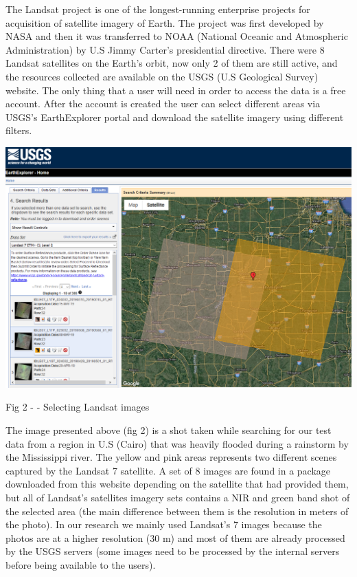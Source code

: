 \documentclass[12pt, a4paper]{report}
\begin{document}
\par 
The Landsat project is one of the longest-running enterprise projects for acquisition of satellite imagery of Earth. The project was first developed by NASA and then it was transferred to NOAA (National Oceanic and Atmospheric Administration) by U.S Jimmy Carter's presidential directive. There were 8 Landsat satellites on the Earth's orbit, now only 2 of them are still active, and the resources collected are available on the USGS (U.S Geological Survey) website. The only thing that a user will need in order to access the data is a free account. After the account is created the user can select different areas via USGS's EarthExplorer portal and download the satellite imagery using different filters.
\par

\bigskip

\includegraphics[scale=0.5, right]{landsat_search.png} 
\begin{center}
Fig 2 - \cite{USGS} - Selecting Landsat images
\end{center}

The image presented above (fig 2) is a shot taken while searching for our test data from a region in U.S (Cairo) that was heavily flooded during a rainstorm by the Mississippi river. The yellow and pink areas represents two different scenes captured by the Landsat 7 satellite. A set of 8 images are found in a package downloaded from this website depending on the satellite that had provided them, but all of Landsat's satellites imagery sets contains a NIR and green band shot of the selected area (the main difference between them is the resolution in meters of the photo). In our research we mainly used Landsat's 7 images because the photos are at a higher resolution (30 m) and most of them are already processed by the USGS servers (some images need to be processed by the internal servers before being available to the users).
\end{document}
